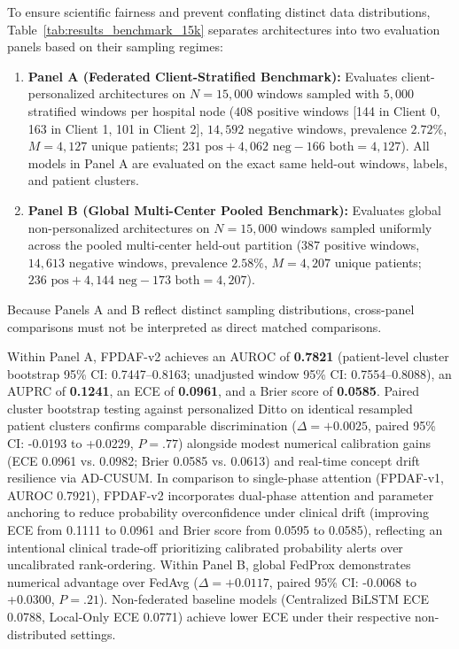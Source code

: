 \documentclass[final,5p,times,twocolumn]{elsarticle}
\begin{document}
To ensure scientific fairness and prevent conflating distinct data distributions, Table~\ref{tab:results_benchmark_15k} separates architectures into two evaluation panels based on their sampling regimes:
\begin{enumerate}
    \item \textbf{Panel A (Federated Client-Stratified Benchmark):} Evaluates client-personalized architectures on $N=15,000$ windows sampled with $5,000$ stratified windows per hospital node ($408$ positive windows [144 in Client 0, 163 in Client 1, 101 in Client 2], $14,592$ negative windows, prevalence $2.72\%$, $M=4,127$ unique patients; $231 \text{ pos} + 4,062 \text{ neg} - 166 \text{ both} = 4,127$). All models in Panel A are evaluated on the exact same held-out windows, labels, and patient clusters.
    \item \textbf{Panel B (Global Multi-Center Pooled Benchmark):} Evaluates global non-personalized architectures on $N=15,000$ windows sampled uniformly across the pooled multi-center held-out partition ($387$ positive windows, $14,613$ negative windows, prevalence $2.58\%$, $M=4,207$ unique patients; $236 \text{ pos} + 4,144 \text{ neg} - 173 \text{ both} = 4,207$).
\end{enumerate}
Because Panels A and B reflect distinct sampling distributions, cross-panel comparisons must not be interpreted as direct matched comparisons.

Within Panel A, FPDAF-v2 achieves an AUROC of \textbf{0.7821} (patient-level cluster bootstrap 95\% CI: 0.7447--0.8163; unadjusted window 95\% CI: 0.7554--0.8088), an AUPRC of \textbf{0.1241}, an ECE of \textbf{0.0961}, and a Brier score of \textbf{0.0585}. Paired cluster bootstrap testing against personalized Ditto on identical resampled patient clusters confirms comparable discrimination ($\Delta = +0.0025$, paired 95\% CI: -0.0193 to +0.0229, $P = .77$) alongside modest numerical calibration gains (ECE 0.0961 vs. 0.0982; Brier 0.0585 vs. 0.0613) and real-time concept drift resilience via AD-CUSUM. In comparison to single-phase attention (FPDAF-v1, AUROC 0.7921), FPDAF-v2 incorporates dual-phase attention and parameter anchoring to reduce probability overconfidence under clinical drift (improving ECE from 0.1111 to 0.0961 and Brier score from 0.0595 to 0.0585), reflecting an intentional clinical trade-off prioritizing calibrated probability alerts over uncalibrated rank-ordering. Within Panel B, global FedProx demonstrates numerical advantage over FedAvg ($\Delta = +0.0117$, paired 95\% CI: -0.0068 to +0.0300, $P = .21$). Non-federated baseline models (Centralized BiLSTM ECE 0.0788, Local-Only ECE 0.0771) achieve lower ECE under their respective non-distributed settings.
\end{document}
